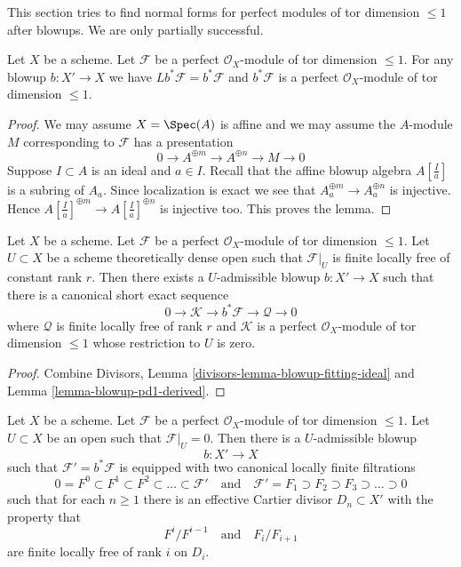 \noindent
This section tries to find normal forms for perfect modules of tor dimension
$\leq 1$ after blowups. We are only partially successful.

\begin{lemma}
\label{lemma-blowup-pd1-derived}
Let $X$ be a scheme. Let $\mathcal{F}$ be a perfect
$\mathcal{O}_X$-module of tor dimension $\leq 1$. For any
blowup $b : X' \to X$ we have $Lb^*\mathcal{F} = b^*\mathcal{F}$
and $b^*\mathcal{F}$ is a perfect $\mathcal{O}_X$-module
of tor dimension $\leq 1$.
\end{lemma}

\begin{proof}
We may assume $X = \Spec(A)$ is affine and we may assume the $A$-module $M$
corresponding to $\mathcal{F}$ has a presentation
$$
0 \to A^{\oplus m} \to A^{\oplus n} \to M \to 0
$$
Suppose $I \subset A$ is an ideal and $a \in I$. Recall that the
affine blowup algebra $A[\frac{I}{a}]$ is a subring of $A_a$.
Since localization is exact we see that $A_a^{\oplus m} \to A_a^{\oplus n}$
is injective. Hence $A[\frac{I}{a}]^{\oplus m} \to A[\frac{I}{a}]^{\oplus n}$
is injective too. This proves the lemma.
\end{proof}

\begin{lemma}
\label{lemma-blowup-pd1}
Let $X$ be a scheme. Let $\mathcal{F}$ be a perfect $\mathcal{O}_X$-module
of tor dimension $\leq 1$. Let $U \subset X$ be a scheme theoretically
dense open such that $\mathcal{F}|_U$ is finite locally free of constant
rank $r$. Then there exists a $U$-admissible blowup $b : X' \to X$ such that
there is a canonical short exact sequence
$$
0 \to \mathcal{K} \to b^*\mathcal{F} \to \mathcal{Q} \to 0
$$
where $\mathcal{Q}$ is finite locally free of rank $r$ and
$\mathcal{K}$ is a perfect $\mathcal{O}_X$-module
of tor dimension $\leq 1$ whose restriction to $U$ is zero.
\end{lemma}

\begin{proof}
Combine Divisors, Lemma \ref{divisors-lemma-blowup-fitting-ideal} and
Lemma \ref{lemma-blowup-pd1-derived}.
\end{proof}

\begin{lemma}
\label{lemma-canonical-blowup-torsion-pd1}
Let $X$ be a scheme. Let $\mathcal{F}$ be a perfect $\mathcal{O}_X$-module
of tor dimension $\leq 1$. Let $U \subset X$ be an open such that
$\mathcal{F}|_U = 0$. Then there is a $U$-admissible blowup
$$
b : X' \to X
$$
such that $\mathcal{F}' = b^*\mathcal{F}$ is equipped with two canonical
locally finite filtrations
$$
0 = F^0 \subset F^1 \subset F^2 \subset \ldots \subset \mathcal{F}'
\quad\text{and}\quad
\mathcal{F}' = F_1 \supset F_2 \supset F_3 \supset \ldots \supset 0
$$
such that for each $n \geq 1$ there is an effective Cartier divisor
$D_n \subset X'$ with the property that
$$
F^i/F^{i - 1}
\quad\text{and}\quad
F_i/F_{i + 1}
$$
are finite locally free of rank $i$ on $D_i$.
\end{lemma}

